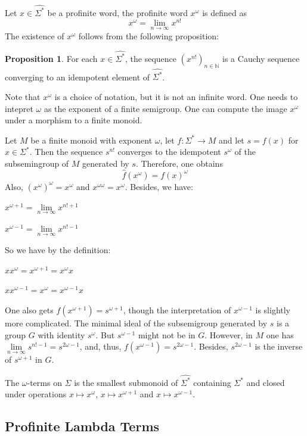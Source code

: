 \documentclass[8pt]{article}
\theoremstyle{definition}
\theoremstyle{definition}
\theoremstyle{definition}
\theoremstyle{definition}
\theoremstyle{definition}
\theoremstyle{definition}
\theoremstyle{definition}
\newtheorem{prop}{Proposition}[section]
\theoremstyle{definition}
\theoremstyle{definition}
\theoremstyle{definition}
\theoremstyle{definition}
\theoremstyle{definition}
\theoremstyle{definition}
\theoremstyle{definition}
\theoremstyle{question}
\begin{document}
Let $x \in \widehat{\Sigma^*}$ be a profinite word, the profinite word $x^{\omega}$ is defined as
\[
x^{\omega} = \lim \limits_{n \to \infty} x^{n!}
\]
The existence of $x^{\omega}$ follows from the following proposition:
\begin{prop}
  For each $x \in \widehat{\Sigma^*}$, the sequence $(x^{n!})_{n \in \mathbb{N}}$ is a Cauchy sequence converging to an idempotent
  element of $\widehat{\Sigma^*}$.
\end{prop}
Note that $x^{\omega}$ is a choice of notation, but it is not an infinite word. One needs to intepret $\omega$
as the exponent of a finite semigroup. One can compute the image $x^{\omega}$ under a morphism to a finite monoid.

Let $M$ be a finite monoid with exponent $\omega$, let $f : \Sigma^* \to M$ and let $s = f(x)$ for $x \in \Sigma^*$.
Then the sequence $s^{n!}$ converges to the idempotent $s^{\omega}$ of the subsemingroup of $M$ generated by $s$. Therefore,
one obtains
\[
\hat{f}(x^{\omega}) = f(x)^{\omega}
\]
Also, $(x^\omega)^{\omega} = x^{\omega}$ and $x^{\omega \omega} = x^{\omega}$. Besides, we have:
\begin{center}
  $x^{\omega + 1} = \lim \limits_{n \to \infty} x^{n! + 1}$

  $x^{\omega - 1} = \lim \limits_{n \to \infty} x^{n! - 1}$
\end{center}
So we have by the definition:
\begin{center}
  $xx^{\omega} = x^{\omega+1} = x^{\omega} x$

  $xx^{\omega - 1} = x^{\omega} = x^{\omega - 1} x$
\end{center}
One also gets $f(x^{\omega+1}) = s^{\omega+1}$, though the interpretation of $x^{\omega - 1}$ is slightly more complicated. 
The minimal ideal of the subsemigroup generated by $s$ is a group $G$ with identity $s^{\omega}$. But $s^{\omega - 1}$ might not be
in $G$. However, in $M$ one has $\lim \limits_{n \to \infty} s^{n! - 1} = s^{2\omega - 1}$, and, thus, $f(x^{\omega - 1}) = s^{2\omega - 1}$.
Besides, $s^{2\omega - 1}$ is the inverse of $s^{\omega + 1}$ in $G$.

The $\omega$-terms on $\Sigma$ is the smallest submonoid of $\widehat{\Sigma^*}$ containing $\Sigma^*$ and closed under operations
$x \mapsto x^{\omega}$, $x \mapsto x^{\omega + 1}$ and $x \mapsto x^{\omega - 1}$.
 
\subsection{Profinite Lambda Terms}
\end{document}
